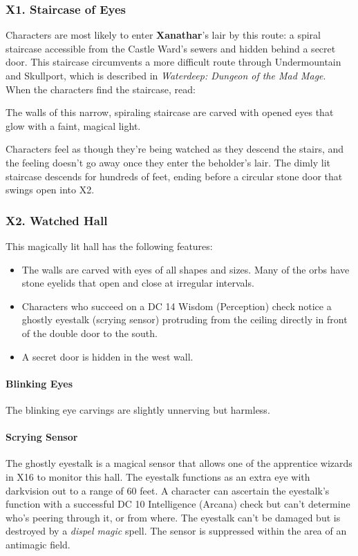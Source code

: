 \documentclass[10pt,a4paper,twoside,twocolumn,openany,nodeprecatedcode]{dndbook}
\begin{document}
\subsubsection{X1. Staircase of Eyes}
Characters are most likely to enter \textbf{Xanathar}'s lair by this route: a spiral staircase accessible from the Castle Ward's sewers and hidden behind a secret door. This staircase circumvents a more difficult route through Undermountain and Skullport, which is described in \textit{Waterdeep: Dungeon of the Mad Mage}.
When the characters find the staircase, read:
\begin{DndReadAloud}{}
The walls of this narrow, spiraling staircase are carved with opened eyes that glow with a faint, magical light.
\end{DndReadAloud}

Characters feel as though they're being watched as they descend the stairs, and the feeling doesn't go away once they enter the beholder's lair. The dimly lit staircase descends for hundreds of feet, ending before a circular stone door that swings open into X2.
\subsubsection{X2. Watched Hall}
This magically lit hall has the following features:
\begin{itemize}

\item The walls are carved with eyes of all shapes and sizes. Many of the orbs have stone eyelids that open and close at irregular intervals.
\item Characters who succeed on a DC 14 Wisdom (Perception) check notice a ghostly eyestalk (scrying sensor) protruding from the ceiling directly in front of the double door to the south.
\item A secret door is hidden in the west wall.
\end{itemize}


\paragraph{Blinking Eyes}
The blinking eye carvings are slightly unnerving but harmless.
\paragraph{Scrying Sensor}
The ghostly eyestalk is a magical sensor that allows one of the apprentice wizards in X16 to monitor this hall. The eyestalk functions as an extra eye with darkvision out to a range of 60 feet. A character can ascertain the eyestalk's function with a successful DC 10 Intelligence (Arcana) check but can't determine who's peering through it, or from where. The eyestalk can't be damaged but is destroyed by a \textit{dispel magic} spell. The sensor is suppressed within the area of an antimagic field.
\end{document}
